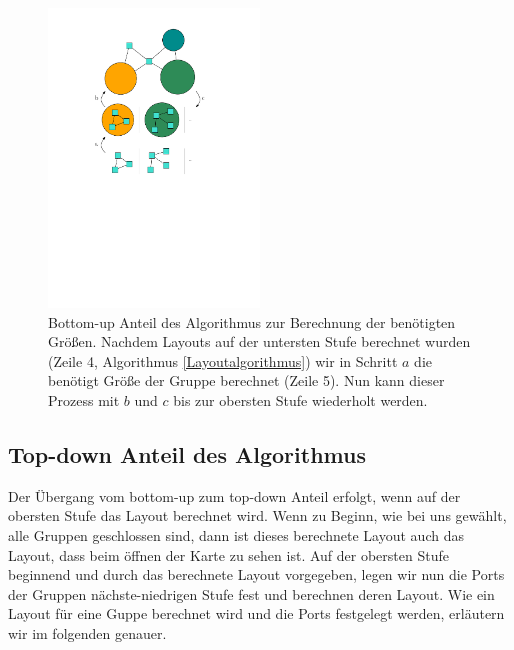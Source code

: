 \begin{figure}[h!]
\begin{center} 
  \includegraphics[width=0.5\textwidth]{Pics/BottomUp2.pdf}
  \caption{Bottom-up Anteil des Algorithmus zur Berechnung der benötigten Größen.
  Nachdem Layouts auf der untersten Stufe berechnet wurden (Zeile 4, Algorithmus \ref{Layoutalgorithmus}) wir in Schritt $a$ die benötigt Größe der Gruppe berechnet (Zeile 5). 
  Nun kann dieser Prozess mit $b$ und $c$ bis zur obersten Stufe wiederholt werden. }
  \label{f:BottomUp}
\end{center}
\end{figure}


\subsection{Top-down Anteil des Algorithmus}
Der Übergang vom bottom-up zum top-down Anteil erfolgt, wenn auf der obersten Stufe das Layout berechnet wird.
Wenn zu Beginn, wie bei uns gewählt, alle Gruppen geschlossen sind, dann ist dieses berechnete Layout auch das Layout, dass beim öffnen der Karte zu sehen ist.
Auf der obersten Stufe beginnend und durch das berechnete Layout vorgegeben, legen wir nun die Ports der Gruppen nächste-niedrigen Stufe fest und berechnen deren Layout.
Wie ein Layout für eine Guppe berechnet wird und die Ports festgelegt werden, erläutern wir im folgenden genauer. 
		
